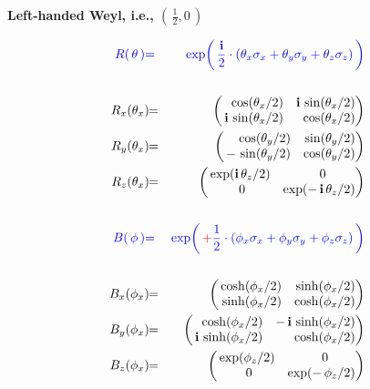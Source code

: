 \begin{frame}{\headingColor\bf\LARGE}

\scriptsize

\begin{multicols}{2}

	\begin{minipage}{7cm}
	\begin{center}
	\vskip -0.75cm
	\textbf{\large Left-handed Weyl, i.e., $\left(\,\frac{1}{2},0\,\right)$}
	\end{center}
	\vskip -0.3cm
	\begin{eqnarray*}
	{\color{blue}R(\,\mathbf{\theta}\,)}
	& {\color{blue}=} &
		{\color{blue}\exp\!\left(\,\frac{\i}{2}\cdot(\theta_{x}\sigma_{x}+\theta_{y}\sigma_{y}+\theta_{z}\sigma_{z})\,\right)}
	\\ \\
	R_{x}(\theta_{x})\!\!
	& = &
		\!\!\left(\!\!\begin{array}{rr} \cos(\theta_{x}/2) & \i\,\sin(\theta_{x}/2) \\ \i\,\sin(\theta_{x}/2) & \cos(\theta_{x}/2) \end{array}\!\!\!\right)
	\\
	R_{y}(\theta_{x})\!\!
	& = &
		\!\!\left(\!\!\begin{array}{rr} \cos(\theta_{y}/2) & \sin(\theta_{y}/2) \\ -\,\sin(\theta_{y}/2) & \cos(\theta_{y}/2) \end{array}\!\!\!\right)
	\\
	R_{z}(\theta_{x})\!\!
	& = &
		\!\!\left(\!\!\begin{array}{cc} \exp(\i\,\theta_{z}/2) & {\color{white}..}0 \\ {\color{white}.}0 & \exp(-\,\i\,\theta_{z}/2) \end{array}\!\!\!\right)
	\\ \\
	{\color{blue}B(\,\mathbf{\phi}\,)}
	& {\color{blue}=} &
		{\color{blue}\exp\!\left(\,{\color{red}+}\frac{1}{2}\cdot(\phi_{x}\sigma_{x}+\phi_{y}\sigma_{y}+\phi_{z}\sigma_{z})\,\right)}
	\\ \\
	B_{x}(\phi_{x})\!\!
	& = &
		\!\!\left(\!\!\begin{array}{rr} \cosh(\phi_{x}/2) & \sinh(\phi_{x}/2) \\ \sinh(\phi_{x}/2) & \cosh(\phi_{x}/2) \end{array}\!\!\!\right)
	\\
	B_{y}(\phi_{x})\!\!
	& = &
		\!\!\left(\!\!\begin{array}{rr} \cosh(\phi_{x}/2) & -\,\i\,\sinh(\phi_{x}/2) \\ \i\,\sinh(\phi_{x}/2) & \cosh(\phi_{x}/2) \end{array}\!\!\!\right)
	\\
	B_{z}(\phi_{x})\!\!
	&=&
		\!\!\left(\!\!\begin{array}{cc} \exp(\phi_{z}/2) & {\color{white}..}0 \\ {\color{white}.}0 & \exp(-\,\phi_{z}/2) \end{array}\!\!\!\right)
	\end{eqnarray*}
	\end{minipage}


\end{multicols}
\end{frame}

